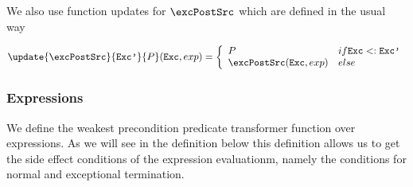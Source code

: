 We also use  function updates for $\excPostSrc$ which are defined in the usual way


$$
\update{\excPostSrc}{\texttt{Exc'} }{ P }(\texttt{Exc}, exp)  = 
       \left\{\begin{array}{ll} 
         P & if \texttt{Exc} <: \texttt{Exc'}  \\
         \excPostSrc(\texttt{Exc}, exp ) & else 
     \end{array}\right.$$


\subsubsection{Expressions}\label{wpExpr}

We define the weakest precondition predicate transformer function over 
expressions. As we will see in the definition below this definition allows us to 
get the side effect conditions of the expression evaluationm, namely the conditions for normal and
exceptional termination. 



